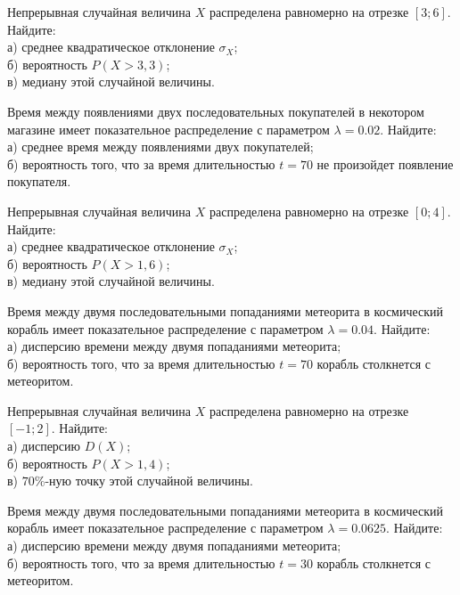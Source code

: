 \vfill

\newpage\setcounter{zad}{0}

\z Непрерывная случайная величина $X$ распределена равномерно на отрезке $[3; 6]$. Найдите: \\ \quad а) среднее квадратическое отклонение $\sigma_X$; \\ \quad б) вероятность $P(X>3{,}3)$; \\ \quad в) медиану этой случайной величины.


\vfill

\z Время между появлениями двух последовательных покупателей в некотором магазине имеет показательное распределение с параметром $\lambda = 0.02$. Найдите: \\ \quad а) среднее время между появлениями двух покупателей; \\ \quad б) вероятность того, что за время длительностью $t = 70$ не произойдет появление покупателя.
 

\vfill

\newpage\setcounter{zad}{0}

\z Непрерывная случайная величина $X$ распределена равномерно на отрезке $[0; 4]$. Найдите: \\ \quad а) среднее квадратическое отклонение $\sigma_X$; \\ \quad б) вероятность $P(X>1{,}6)$; \\ \quad в) медиану этой случайной величины.


\vfill

\z Время между двумя последовательными попаданиями метеорита в космический корабль имеет показательное распределение с параметром $\lambda = 0.04$. Найдите: \\ \quad а) дисперсию времени между двумя попаданиями метеорита; \\ \quad б) вероятность того, что за время длительностью $t = 70$ корабль  столкнется с метеоритом.
 

\vfill

\newpage\setcounter{zad}{0}

\z Непрерывная случайная величина $X$ распределена равномерно на отрезке $[-1; 2]$. Найдите: \\ \quad а) дисперсию $D(X)$; \\ \quad б) вероятность $P(X>1{,}4)$; \\ \quad в) $70\%$-ную точку этой случайной величины.


\vfill

\z Время между двумя последовательными попаданиями метеорита в космический корабль имеет показательное распределение с параметром $\lambda = 0.0625$. Найдите: \\ \quad а) дисперсию времени между двумя попаданиями метеорита; \\ \quad б) вероятность того, что за время длительностью $t = 30$ корабль  столкнется с метеоритом.
 


